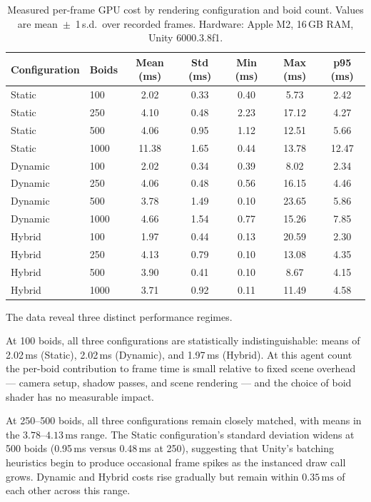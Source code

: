 \documentclass[12pt]{article}
\begin{document}
\begin{table}[htbp]
  \centering
  \caption{Measured per-frame GPU cost by rendering configuration and boid count. Values are mean~$\pm$~1\,s.d.\ over recorded frames. Hardware: Apple M2, 16\,GB RAM, Unity 6000.3.8f1.}
  \label{tab:frame-cost}
  \begin{tabular}{llccccc}
    \toprule
    \textbf{Configuration} & \textbf{Boids} & \textbf{Mean (ms)} & \textbf{Std (ms)} & \textbf{Min (ms)} & \textbf{Max (ms)} & \textbf{p95 (ms)} \\
    \midrule
    Static & 100 & 2.02 & 0.33 & 0.40 & 5.73 & 2.42 \\
    Static & 250 & 4.10 & 0.48 & 2.23 & 17.12 & 4.27 \\
    Static & 500 & 4.06 & 0.95 & 1.12 & 12.51 & 5.66 \\
    Static & 1000 & 11.38 & 1.65 & 0.44 & 13.78 & 12.47 \\
    Dynamic & 100 & 2.02 & 0.34 & 0.39 & 8.02 & 2.34 \\
    Dynamic & 250 & 4.06 & 0.48 & 0.56 & 16.15 & 4.46 \\
    Dynamic & 500 & 3.78 & 1.49 & 0.10 & 23.65 & 5.86 \\
    Dynamic & 1000 & 4.66 & 1.54 & 0.77 & 15.26 & 7.85 \\
    Hybrid & 100 & 1.97 & 0.44 & 0.13 & 20.59 & 2.30 \\
    Hybrid & 250 & 4.13 & 0.79 & 0.10 & 13.08 & 4.35 \\
    Hybrid & 500 & 3.90 & 0.41 & 0.10 & 8.67 & 4.15 \\
    Hybrid & 1000 & 3.71 & 0.92 & 0.11 & 11.49 & 4.58 \\
    \bottomrule
  \end{tabular}
\end{table}

The data reveal three distinct performance regimes.

At 100 boids, all three configurations are statistically indistinguishable: means of 2.02\,ms (Static), 2.02\,ms (Dynamic), and 1.97\,ms (Hybrid). At this agent count the per-boid contribution to frame time is small relative to fixed scene overhead --- camera setup, shadow passes, and scene rendering --- and the choice of boid shader has no measurable impact.

At 250--500 boids, all three configurations remain closely matched, with means in the $3.78$--$4.13\,\text{ms}$ range. The Static configuration's standard deviation widens at 500 boids (0.95\,ms versus 0.48\,ms at 250), suggesting that Unity's batching heuristics begin to produce occasional frame spikes as the instanced draw call grows. Dynamic and Hybrid costs rise gradually but remain within $0.35\,\text{ms}$ of each other across this range.
\end{document}
